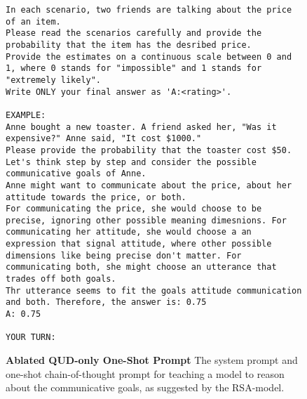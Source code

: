 \begin{figure}[htpb]
\centering
\begin{tcolorbox}[
width=1\linewidth,
title={Ablated QUD-only One-Shot Prompt}]
\fontsize{5pt}{5pt}\selectfont
\ttfamily
\begin{lstlisting}[language={}]
In each scenario, two friends are talking about the price of an item.
Please read the scenarios carefully and provide the probability that the item has the desribed price.
Provide the estimates on a continuous scale between 0 and 1, where 0 stands for "impossible" and 1 stands for "extremely likely".
Write ONLY your final answer as 'A:<rating>'.

EXAMPLE:
Anne bought a new toaster. A friend asked her, "Was it expensive?" Anne said, "It cost $1000."
Please provide the probability that the toaster cost $50.
Let's think step by step and consider the possible communicative goals of Anne.
Anne might want to communicate about the price, about her attitude towards the price, or both.
For communicating the price, she would choose to be precise, ignoring other possible meaning dimesnions. For communicating her attitude, she would choose a an expression that signal attitude, where other possible dimensions like being precise don't matter. For communicating both, she might choose an utterance that trades off both goals. 
Thr utterance seems to fit the goals attitude communication and both. Therefore, the answer is: 0.75
A: 0.75

YOUR TURN:

\end{lstlisting}
\end{tcolorbox}
\caption{\textbf{Ablated QUD-only One-Shot Prompt}
The system prompt and one-shot chain-of-thought prompt for teaching a model to reason about the communicative goals, as suggested by the RSA-model.}
\label{prompt:rsa-qud}
\end{figure}